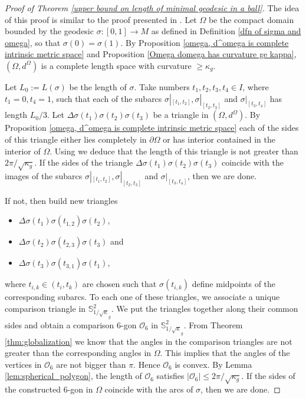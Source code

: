 \documentclass[12pt]{amsart}
\numberwithin{equation}{section}
\theoremstyle{remark}
\begin{document}
	\begin{proof} [Proof of Theorem \ref{upper bound on length of minimal geodesic in a ball}] The idea of this proof is similar to the proof presented in \cite[Theorem 3.4.10]{Klingenberg}. Let $\Omega$ be the compact domain bounded by the geodesic $\sigma: [0,1] \to M$ as defined in Definition \ref{dfn of sigma and omega}, so that $\sigma(0)=\sigma(1)$. By Proposition \ref{omega, d^omega is complete intrinsic metric space} and Proposition \ref{Omega domega has curvature ge kappa}, $(\Omega, d^\Omega)$ is a complete length space with curvature $\geq \kappa_g$. 
		
		Let $L_0 := L(\sigma)$ be the length of $\sigma$. Take numbers $t_1,t_2,t_3,t_4 \in I$, where $t_1=0, t_4=1$, such that each of the subarcs $\sigma|_{[t_1,t_2]}, \sigma|_{[t_2,t_3]}$ and $\sigma|_{[t_3,t_4]}$  has length $L_0/3$. Let $\Delta \sigma(t_1)\sigma(t_2)\sigma(t_3)$ be a triangle in $(\Omega, d^\Omega)$. By Proposition \ref{omega, d^omega is complete intrinsic metric space} each of the sides of this triangle either lies completely in $\partial \Omega$ or has interior contained in the interior of $\Omega$. Using \cite[Corollary 10.4.2.]{BBI} we deduce that the length of this triangle is not greater than $2\pi/\sqrt{\kappa_g}$. If the sides of the triangle $\Delta \sigma(t_1)\sigma(t_2)\sigma(t_3)$ coincide with the images of the subarcs $\sigma|_{[t_1,t_2]}, \sigma|_{[t_2,t_3]}$ and $\sigma|_{[t_3,t_4]}$, then we are done. 
		
		If not, then build new triangles 
		\begin{itemize}
			\item $\Delta \sigma(t_1)\sigma(t_{1,2})\sigma(t_2)$, 
			\item $\Delta \sigma(t_2)\sigma(t_{2,3})\sigma(t_3)$ and 
			\item $\Delta \sigma(t_3)\sigma(t_{3,1})\sigma(t_1)$,
		\end{itemize}
		where $t_{i,k} \in (t_i,t_k)$ are chosen such that $\sigma(t_{i,k})$ define midpoints of the corresponding subarcs. To each one of these triangles, we associate a unique comparison triangle in $\mathbb S^2_{1/\sqrt\kappa_g}$. We put the triangles together along their common sides and obtain a comparison $6$-gon $\mathcal{O}_6$ in $\mathbb S^2_{1/\sqrt\kappa_g}$. From Theorem \ref{thm:globalization} we know that the angles in the comparison triangles are not greater than the corresponding angles in $\Omega$. This implies that the angles of the vertices in $\mathcal{O}_6$ are not bigger than $\pi$. Hence $\mathcal{O}_6$ is convex. By Lemma \ref{lem:spherical_polygon}, the length of $\mathcal{O}_6$ satisfies $|\mathcal{O}_6|\leq 2\pi/\sqrt{\kappa_g}$. If the sides of the constructed 6-gon in $\Omega$ coincide with the arcs of $\sigma$, then we are done. 
		

\end{proof}
\end{document}
